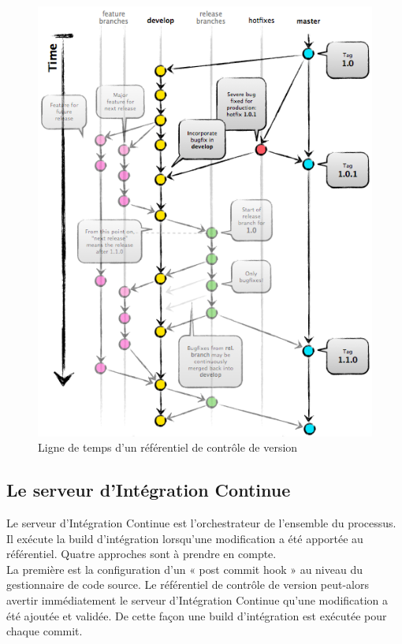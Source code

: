 \documentclass{report}
\begin{document}
      \begin{figure}
        \begin{center}
          \includegraphics[scale=0.5]{images/gitFlow.png}
        \end{center}
        \caption{Ligne de temps d'un référentiel de contrôle de version}
      \end{figure}

      \subsection{Le serveur d’Intégration Continue}
      Le serveur d’Intégration Continue est l'orchestrateur de l'ensemble du processus. Il exécute la build d'intégration lorsqu'une modification a été apportée au référentiel. Quatre approches sont à prendre en compte.\\

      La première est la configuration d’un « post commit hook » au niveau du gestionnaire de code source. Le référentiel de contrôle de version peut-alors avertir immédiatement le serveur d’Intégration Continue qu’une modification a été ajoutée et validée. De cette façon une build d’intégration est exécutée pour chaque commit.\\
\end{document}
